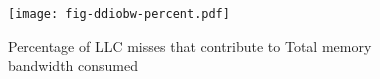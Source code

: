 \begin{figure}[H]
\texttt{[image: fig-ddiobw-percent.pdf]}
\caption{Percentage of LLC misses that contribute to Total memory bandwidth consumed}
\label{fig:ddiobw-percent}
\end{figure}
